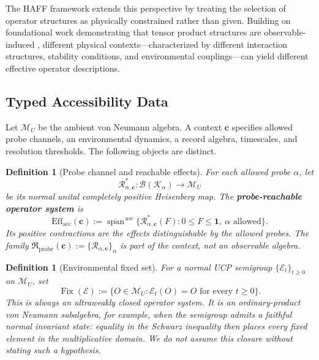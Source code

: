 \documentclass[12pt,a4paper,openany]{book}
\newtheorem{definition}[theorem]{Definition}
\begin{document}
The HAFF framework extends this perspective by treating the selection of operator structures as physically constrained rather than given. Building on foundational work demonstrating that tensor product structures are observable-induced \cite{Zanardi2001,Zanardi2004}, different physical contexts---characterized by different interaction structures, stability conditions, and environmental couplings---can yield different effective operator descriptions.

\subsection{Typed Accessibility Data}

Let $\mathcal M_U$ be the ambient von Neumann algebra.  A context $\mathbf c$ specifies allowed probe channels, an environmental dynamics, a record algebra, timescales, and resolution thresholds.  The following objects are distinct.

\begin{definition}[Probe channel and reachable effects]
\label{H-E-def:probe-effects}
For each allowed probe $\alpha$, let
\[
\mathcal R_{\alpha,\mathbf c}^{*}:\mathcal B(\mathcal K_\alpha)\longrightarrow\mathcal M_U
\]
be its normal unital completely positive Heisenberg map.  The \textbf{probe-reachable operator system} is
\[
\mathrm{Eff}_{\mathrm{acc}}(\mathbf c)
:=\overline{\operatorname{span}}^{\,uw}
\{\mathcal R_{\alpha,\mathbf c}^{*}(F):0\le F\le\mathbf 1,
\ \alpha\text{ allowed}\}.
\]
Its positive contractions are the effects distinguishable by the allowed probes.  The family $\mathfrak R_{\mathrm{probe}}(\mathbf c):=\{\mathcal R_{\alpha,\mathbf c}\}_\alpha$ is part of the context, not an observable algebra.
\end{definition}

\begin{definition}[Environmental fixed set]
\label{H-E-def:fixed-set}
For a normal UCP semigroup $\{\mathcal E_t\}_{t\ge0}$ on $\mathcal M_U$, set
\[
\operatorname{Fix}(\mathcal E)
:=\{O\in\mathcal M_U:\mathcal E_t(O)=O\text{ for every }t\ge0\}.
\]
This is always an ultraweakly closed operator system.  It is an ordinary-product von Neumann subalgebra, for example, when the semigroup admits a faithful normal invariant state: equality in the Schwarz inequality then places every fixed element in the multiplicative domain.  We do not assume this closure without stating such a hypothesis.
\end{definition}
\end{document}
